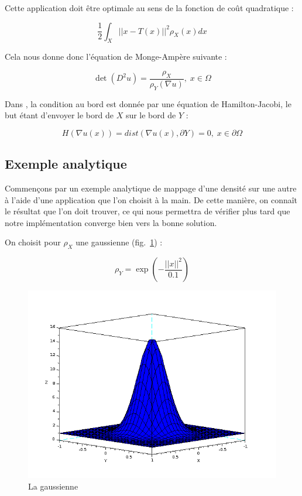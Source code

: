 \documentclass[12pt,a4paper,twoside]{article}
\begin{document}
Cette application doit être optimale au sens de la fonction de coût quadratique :

$$\frac{1}{2} \int_X ||x-T(x)||^2\rho_X(x) dx $$

Cela nous donne donc l'équation de Monge-Ampère suivante : 

\begin{equation}
\det(D^2 u) = \frac{\rho_X}{\rho_Y(\nabla u)}, \; x \in \Omega
\end{equation}


Dans \cite{benamou2014numerical}, la condition au bord est donnée par une équation de Hamilton-Jacobi, le but
étant d'envoyer le bord de $X$ sur le bord de $Y$ :

\begin{equation}
H(\nabla u(x)) = dist(\nabla u(x), \partial Y) = 0, \; x \in \partial \Omega
\end{equation}

\subsection{Exemple analytique}

Commençons par un exemple analytique de mappage d'une densité sur une autre à l'aide d'une application que l'on choisit
à la main. De cette manière, on connaît le résultat que l'on doit trouver, ce qui nous permettra de vérifier plus
tard que notre implémentation converge bien vers la bonne solution.

On choisit pour  $\rho_X$ une gaussienne (fig.~\ref{gaussienne}) : 

\begin{equation}
\rho_Y = \exp(- \frac{||x||^2}{ 0.1}) 
\end{equation}


\begin{figure}
\begin{center}
\includegraphics[scale=0.5]{Images/gaussienne.png}
\caption{La gaussienne}
\label{gaussienne}
\end{center}
\end{figure}
\end{document}
